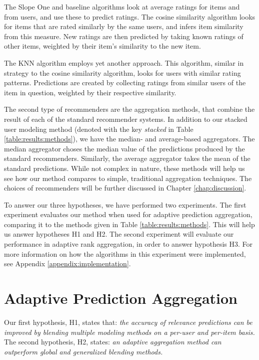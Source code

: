The Slope One and baseline algorithms look at average
ratings for items and from users, and use these to predict ratings.
The cosine similarity algorithm looks for items that are rated
similarly by the same users, and infers item similarity from this measure.
New ratings are then predicted by taking known ratings of other items,
weighted by their item's similarity to the new item.

The KNN algorithm employs yet another approach. This algorithm,
similar in strategy to the cosine similarity algorithm,
looks for users with similar rating patterns.
Predictions are created by collecting ratings from similar users
of the item in question, weighted by their respective similarity.

The second type of recommenders are the aggregation methods, 
that combine the result of each of the standard recommender systems.
In addition to our stacked user modeling method
(denoted with the key \emph{stacked} in Table \ref{table:results:methods}),
we have the median- and average-based aggregators.
The median aggregator choses the median value of the predictions
produced by the standard recommenders.
Similarly, the average aggregator takes the mean of the
standard predictions.
While not complex in nature, these methods
will help us see how our method compares to simple, traditional
aggregation techniques.
The choices of recommenders will be further discussed
in Chapter \ref{chap:discussion}.

To answer our three hypotheses, we have performed two experiments.
The first experiment evaluates our method when used for
adaptive prediction aggregation, comparing it to 
the methods given in Table \ref{table:results:methods}.
This will help us answer hypotheses H1 and H2.
The second experiment will evaluate our performance
in adaptive rank aggregation, in order to answer hypothesis H3.
For more information on how the algorithms
in this experiment were implemented, see Appendix \ref{appendix:implementation}.



\section{Adaptive Prediction Aggregation}

Our first hypothesis, H1, states that:
{
  \itshape
  the accuracy of relevance predictions can be improved
  by blending multiple modeling methods on a per-user and per-item basis.
}
The second hypothesis, H2, states:
{
  \itshape
  an adaptive aggregation method can outperform global and generalized 
  blending methods.
}

